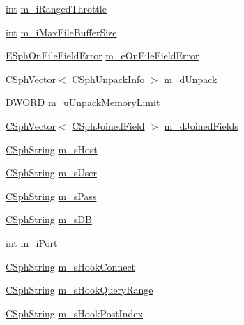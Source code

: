 \begin{DoxyCompactItemize}
\item 
\hyperlink{sphinxexpr_8cpp_a4a26e8f9cb8b736e0c4cbf4d16de985e}{int} \hyperlink{structCSphSourceParams__SQL_a60b84576374653e54c0f5ff0fd119b78}{m\-\_\-i\-Ranged\-Throttle}
\item 
\hyperlink{sphinxexpr_8cpp_a4a26e8f9cb8b736e0c4cbf4d16de985e}{int} \hyperlink{structCSphSourceParams__SQL_a9958293ab91e583204278bbae8c5295e}{m\-\_\-i\-Max\-File\-Buffer\-Size}
\item 
\hyperlink{sphinx_8h_ac6ec6f15ff9fc4c04126351b336cfe3d}{E\-Sph\-On\-File\-Field\-Error} \hyperlink{structCSphSourceParams__SQL_a6f032f9707d82321aa901130b97d9c80}{m\-\_\-e\-On\-File\-Field\-Error}
\item 
\hyperlink{classCSphVector}{C\-Sph\-Vector}$<$ \hyperlink{structCSphUnpackInfo}{C\-Sph\-Unpack\-Info} $>$ \hyperlink{structCSphSourceParams__SQL_a78975fb64770f1f6bfec57935be500d9}{m\-\_\-d\-Unpack}
\item 
\hyperlink{sphinxstd_8h_a798af1e30bc65f319c1a246cecf59e39}{D\-W\-O\-R\-D} \hyperlink{structCSphSourceParams__SQL_a7babd5f68bfa34fe7e64e59aafcebd53}{m\-\_\-u\-Unpack\-Memory\-Limit}
\item 
\hyperlink{classCSphVector}{C\-Sph\-Vector}$<$ \hyperlink{structCSphJoinedField}{C\-Sph\-Joined\-Field} $>$ \hyperlink{structCSphSourceParams__SQL_a51e80055584b1ae2e2caa2398c280b88}{m\-\_\-d\-Joined\-Fields}
\item 
\hyperlink{structCSphString}{C\-Sph\-String} \hyperlink{structCSphSourceParams__SQL_aadef0bd0c39017305d537ec26dbd4c30}{m\-\_\-s\-Host}
\item 
\hyperlink{structCSphString}{C\-Sph\-String} \hyperlink{structCSphSourceParams__SQL_abd5d8e81bae7c613b9610e289c08ae00}{m\-\_\-s\-User}
\item 
\hyperlink{structCSphString}{C\-Sph\-String} \hyperlink{structCSphSourceParams__SQL_a1ffe51628a68da1aa78ee21e5b2bbfb9}{m\-\_\-s\-Pass}
\item 
\hyperlink{structCSphString}{C\-Sph\-String} \hyperlink{structCSphSourceParams__SQL_a24defccce8494957e7f38119dcab26ad}{m\-\_\-s\-D\-B}
\item 
\hyperlink{sphinxexpr_8cpp_a4a26e8f9cb8b736e0c4cbf4d16de985e}{int} \hyperlink{structCSphSourceParams__SQL_aa68e3a13b6b1675a0720f312dfe120ba}{m\-\_\-i\-Port}
\item 
\hyperlink{structCSphString}{C\-Sph\-String} \hyperlink{structCSphSourceParams__SQL_abb0b53bedda13d02d1bfc07378b6b291}{m\-\_\-s\-Hook\-Connect}
\item 
\hyperlink{structCSphString}{C\-Sph\-String} \hyperlink{structCSphSourceParams__SQL_acbe47a3e829722d42a40d90d4225bcf6}{m\-\_\-s\-Hook\-Query\-Range}
\item 
\hyperlink{structCSphString}{C\-Sph\-String} \hyperlink{structCSphSourceParams__SQL_aa4c1902f394a317da2e6d1b758be7e61}{m\-\_\-s\-Hook\-Post\-Index}
\end{DoxyCompactItemize}


